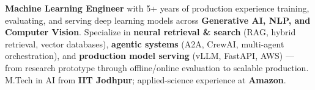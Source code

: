 \documentclass[letter,10pt]{article}
\begin{document}

\textbf{Machine Learning Engineer} with 5+ years of production experience training, evaluating, and serving deep learning models across \textbf{Generative AI, NLP, and Computer Vision}.
Specialize in \textbf{neural retrieval \& search} (RAG, hybrid retrieval, vector databases), \textbf{agentic systems} (A2A, CrewAI, multi-agent orchestration), and \textbf{production model serving} (vLLM, FastAPI, AWS) — from research prototype through offline/online evaluation to scalable production.
M.Tech in AI from \textbf{IIT Jodhpur}; applied-science experience at \textbf{Amazon}.
\end{document}
